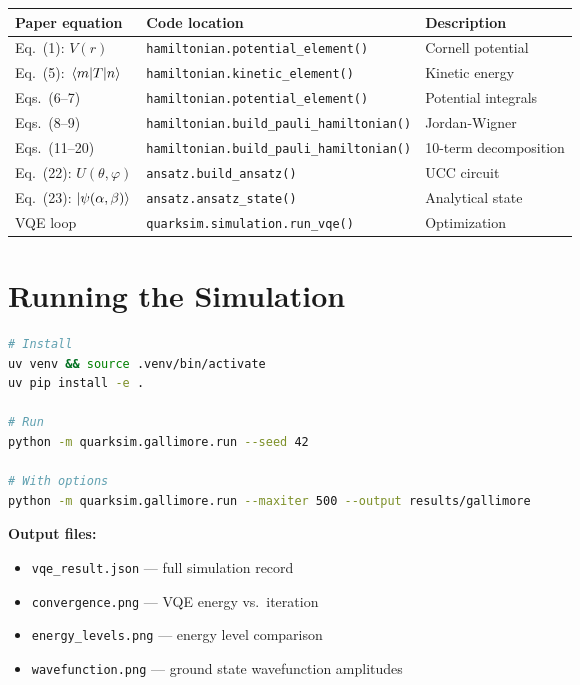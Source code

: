 \documentclass[11pt,a4paper]{article}
\begin{document}
\begin{center}
\begin{tabular}{lll}
\toprule
Paper equation & Code location & Description \\
\midrule
Eq.~(1): $V(r)$ & \texttt{hamiltonian.potential\_element()} & Cornell potential \\
Eq.~(5): $\mel{m}{T}{n}$ & \texttt{hamiltonian.kinetic\_element()} & Kinetic energy \\
Eqs.~(6--7) & \texttt{hamiltonian.potential\_element()} & Potential integrals \\
Eqs.~(8--9) & \texttt{hamiltonian.build\_pauli\_hamiltonian()} & Jordan-Wigner \\
Eqs.~(11--20) & \texttt{hamiltonian.build\_pauli\_hamiltonian()} & 10-term decomposition \\
Eq.~(22): $U(\theta,\varphi)$ & \texttt{ansatz.build\_ansatz()} & UCC circuit \\
Eq.~(23): $\ket{\psi(\alpha,\beta)}$ & \texttt{ansatz.ansatz\_state()} & Analytical state \\
VQE loop & \texttt{quarksim.simulation.run\_vqe()} & Optimization \\
\bottomrule
\end{tabular}
\end{center}


\section{Running the Simulation}

\begin{lstlisting}[language=bash]
# Install
uv venv && source .venv/bin/activate
uv pip install -e .

# Run
python -m quarksim.gallimore.run --seed 42

# With options
python -m quarksim.gallimore.run --maxiter 500 --output results/gallimore
\end{lstlisting}

\textbf{Output files:}
\begin{itemize}[nosep]
  \item \texttt{vqe\_result.json} --- full simulation record
  \item \texttt{convergence.png} --- VQE energy vs.\ iteration
  \item \texttt{energy\_levels.png} --- energy level comparison
  \item \texttt{wavefunction.png} --- ground state wavefunction amplitudes
\end{itemize}
\end{document}
